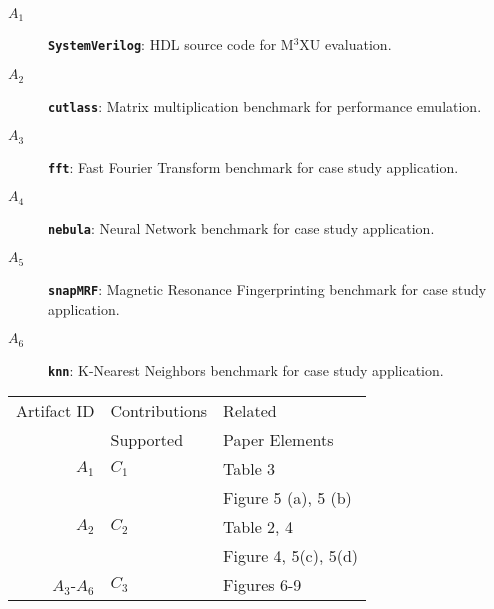 \documentclass[conference]{IEEEtran}
\newcommand{\MPCMXU}[1]{M$^{3}$XU}
\begin{document}
\begin{description}
    \item[$A_1$] \textbf{\texttt{SystemVerilog}}: HDL source code for \MPCMXU{} evaluation.
    \item[$A_2$] \textbf{\texttt{cutlass}}: Matrix multiplication benchmark for performance emulation.
    \item[$A_3$] \textbf{\texttt{fft}}: Fast Fourier Transform benchmark for case study application.
    \item[$A_4$] \textbf{\texttt{nebula}}: Neural Network benchmark for case study application.
    \item[$A_5$] \textbf{\texttt{snapMRF}}: Magnetic Resonance Fingerprinting benchmark for case study application.
    \item[$A_6$] \textbf{\texttt{knn}}: K-Nearest Neighbors benchmark for case study application.
\end{description}


\begin{center}
\begin{tabular}{rll}
\toprule
Artifact ID  &  Contributions &  Related \\
             &  Supported     &  Paper Elements \\
\midrule
$A_1$   &  $C_1$ & Table 3 \\
        &        & Figure 5 (a), 5 (b)\\
\midrule
$A_2$   &  $C_2$ & Table 2, 4 \\
        &        & Figure 4, 5(c), 5(d)\\
\midrule
$A_3$-$A_6$   &  $C_3$ & Figures 6-9 \\
\bottomrule
\end{tabular}
\end{center}
\end{document}
